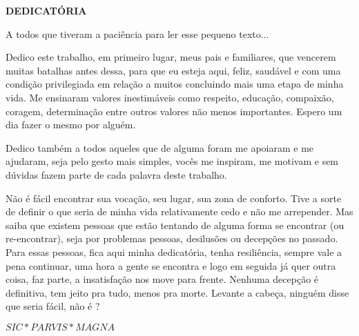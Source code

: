 \begin{center}
\textbf{DEDICATÓRIA}
\end{center}

$\!$\\


A todos que tiveram a paciência para ler esse pequeno texto...
\vspace{1cm}

Dedico este trabalho, em primeiro lugar, meus pais e familiares, que vencerem muitas batalhas antes dessa, para que eu esteja aqui, feliz, saudável e com uma condição privilegiada em relação a muitos concluindo mais uma etapa de minha vida. Me ensinaram valores inestimáveis como respeito, educação, compaixão, coragem, determinação entre outros valores não menos importantes. Espero um dia fazer o mesmo por alguém.

Dedico também a todos aqueles que de alguma foram me apoiaram e me ajudaram, seja pelo gesto mais simples, vocês me inspiram, me motivam e sem dúvidas fazem parte de cada palavra deste trabalho.


Não é fácil encontrar sua vocação, seu lugar, sua zona de conforto. Tive a sorte de definir o que seria de minha vida relativamente cedo e não me arrepender. Mas saiba que existem pessoas que estão tentando de alguma forma se encontrar (ou re-encontrar), seja por problemas pessoas, desilusões ou decepções no passado. Para essas pessoas, fica aqui minha dedicatória, tenha resiliência, sempre vale a pena continuar, uma hora a gente se encontra e logo em seguida já quer outra coisa, faz parte, a insatisfação nos move para frente. Nenhuma decepção é definitiva, tem jeito pra tudo, menos pra morte. Levante a cabeça, ninguém disse que seria fácil, não é ?

\vfill

$SIC * PARVIS * MAGNA$
